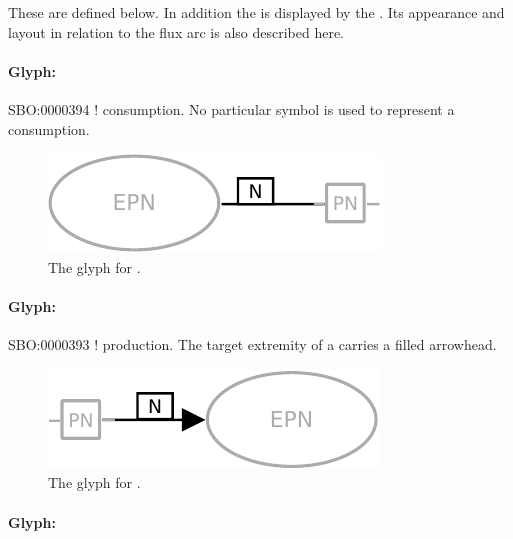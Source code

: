 These are defined below. In addition the  is
displayed by the . Its appearance and
layout in relation to the flux arc is also described here.

\paragraph{Glyph: }
\label{sec:techref:consumption}

\begin{glyphDescription}
 \glyphSboTerm SBO:0000394 ! consumption.
 \glyphEndPoint No particular symbol is used to represent a consumption.
\end{glyphDescription}


\begin{figure}[htb]
  \centering
  \includegraphics[scale = 0.4]{images/consumption}
  \caption{The \PD glyph for .}
  \label{fig:techref:consumption}
\end{figure}

\paragraph{Glyph: }\label{sec:techref:production}

\begin{glyphDescription}
 \glyphSboTerm SBO:0000393 ! production.
 \glyphEndPoint The target extremity of a  carries a filled arrowhead.
 \end{glyphDescription}

\begin{figure}[htb]
  \centering
  \includegraphics[scale = 0.4]{images/production}
  \caption{The \PD glyph for .}
  \label{fig:techref:production}
\end{figure}

\paragraph{Glyph: }\label{sec:techref:reversible}

